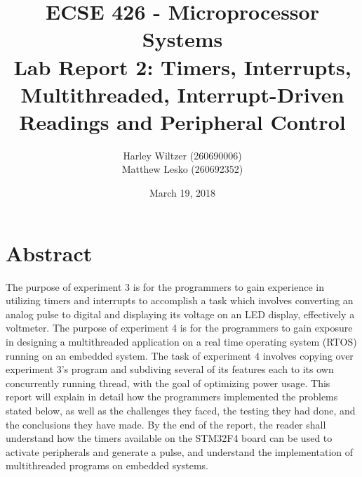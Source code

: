 \documentclass[12pt]{report}
\title{ECSE 426 - Microprocessor Systems\\Lab Report 2: Timers, Interrupts, Multithreaded, Interrupt-Driven Readings and Peripheral Control}
\author{Harley Wiltzer (260690006)\\Matthew Lesko (260692352)}
\date{March 19, 2018}
\begin{document}
\maketitle
{}
\tableofcontents
\listoffigures
\let\clearpage\relax
\listoftables
\newpage
{}
\section{Abstract}
The purpose of experiment 3 is for the programmers to gain experience in utilizing timers and interrupts to accomplish a task which involves converting an analog pulse to digital and displaying its voltage on an LED display, effectively a voltmeter. The purpose of experiment 4 is for the programmers to gain exposure in designing a multithreaded application on a real time operating system (RTOS) running on an embedded system. The task of experiment 4 involves copying over experiment 3's program and subdiving several of its features each to its own concurrently running thread, with the goal of optimizing power usage. This report will explain in detail how the programmers implemented the problems stated below, as well as the challenges they faced, the testing they had done, and the conclusions they have made. By the end of the report, the reader shall understand how the timers available on the STM32F4 board can be used to activate peripherals and generate a pulse, and understand the implementation of multithreaded programs on embedded systems.
\end{document}
